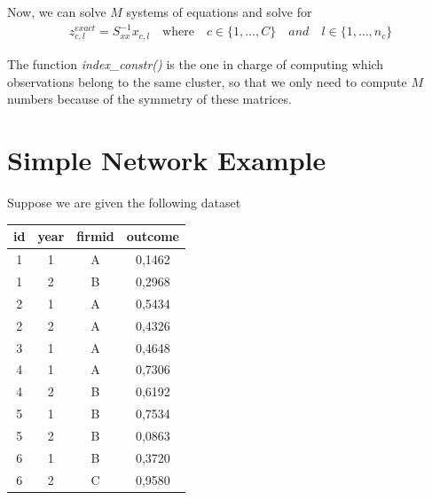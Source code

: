 \documentclass[12pt]{article}
\begin{document}
Now, we can solve $M$ systems of equations and solve for
 \begin{align*}
     z_{c,l}^{exact} = S_{xx}^{-1} x_{c,l} \quad \text{where} \quad c\in\{1,\dots,C\} \quad and \quad l\in\{1,\dots,n_c\}
 \end{align*}

The function \textit{index\_constr()} is the one in charge of computing which observations belong to the same cluster, so that we only need to compute $M$ numbers because of the symmetry of these matrices.


\clearpage
\appendix

\section{Simple Network Example}

Suppose we are given the following dataset

\begin{table}[h!]
    \centering
\begin{tabular}{|c c c c|} 
 \hline
 id & year & firmid & outcome \\ [0.5ex] 
 \hline\hline
 1 & 1 & A &  0,1462\\ 
 \hline
 1 & 2 & B & 0,2968 \\
 \hline
 2 & 1 & A &  0,5434\\
 \hline
 2 & 2 & A & 0,4326 \\
 \hline
 3 & 1 & A & 0,4648 \\
 \hline
 4 & 1 & A & 0,7306 \\
 \hline
 4 & 2 & B & 0,6192 \\
 \hline
 5 & 1 & B &  0,7534\\
 \hline
 5 & 2 & B &  0,0863\\
 \hline
6 & 1 & B &  0,3720\\
 \hline
 6 & 2 & C & 0,9580 \\ [1ex] 
 \hline
\end{tabular}
\end{table}
\end{document}

